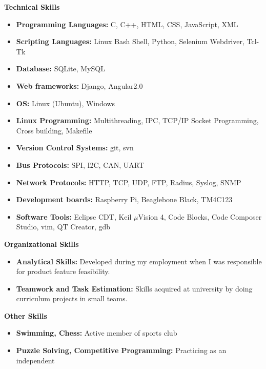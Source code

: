 \documentclass[letterpaper,10pt]{article}
\newcommand{\resheading}[1]{{\large \colorbox{mygrey}{\begin{minipage}{\textwidth}{\textbf{#1 \vphantom{p\^{E}}}}\end{minipage}}}}
\begin{document}
\resheading{Technical Skills}
\begin{itemize}
\item \textbf{Programming Languages:} C, C++, HTML, CSS, JavaScript, XML
\item \textbf{Scripting Languages:} Linux Bash Shell, Python, Selenium Webdriver, Tcl-Tk
\item \textbf{Database:} SQLite, MySQL
\item \textbf{Web frameworks:} Django, Angular2.0
\item \textbf{OS:} Linux (Ubuntu), Windows
\item \textbf{Linux Programming:} Multithreading, IPC, TCP/IP Socket Programming, Cross building, Makefile
\item \textbf{Version Control Systems:} git, svn
\item \textbf{Bus Protocols:} SPI, I2C, CAN, UART
\item \textbf{Network Protocols:} HTTP, TCP, UDP, FTP, Radius, Syslog, SNMP
\item \textbf{Development boards:} Raspberry Pi, Beaglebone Black, TM4C123
\item \textbf{Software Tools:} Eclipse CDT, Keil $\mu$Vision 4, Code Blocks, Code Composer Studio, vim, QT Creator, gdb

\end{itemize}

\resheading{Organizational Skills}
\begin{itemize}
\item \textbf{Analytical Skills:} Developed during my employment when I was responsible for product feature feasibility.
\item \textbf{Teamwork and Task Estimation:} Skills acquired at university by doing curriculum projects in small teams.

\end{itemize}

\resheading{Other Skills}
    \begin{itemize}
        \item \textbf{Swimming, Chess:} Active member of sports club
        \item \textbf{Puzzle Solving, Competitive Programming:} Practicing as an independent
    \end{itemize}
\end{document}
